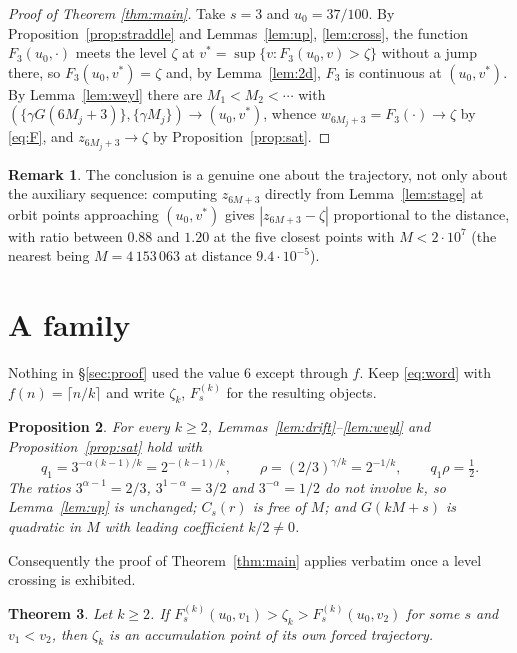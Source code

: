 \documentclass[11pt,a4paper]{article}
\theoremstyle{plain}
\newtheorem{theorem}{Theorem}
\newtheorem{proposition}[theorem]{Proposition}
\theoremstyle{definition}
\newtheorem{remark}[theorem]{Remark}
\newcommand{\al}{\alpha}
\newcommand{\ga}{\gamma}
\newcommand{\fr}[1]{\{#1\}}
\begin{document}
\begin{proof}[Proof of Theorem \ref{thm:main}]
Take $s=3$ and $u_0=37/100$. By Proposition~\ref{prop:straddle} and Lemmas~\ref{lem:up},
\ref{lem:cross}, the function $F_3(u_0,\cdot)$ meets the level $\zeta$ at
$v^*=\sup\{v:F_3(u_0,v)>\zeta\}$ without a jump there, so $F_3(u_0,v^*)=\zeta$ and, by
Lemma~\ref{lem:2d}, $F_3$ is continuous at $(u_0,v^*)$. By Lemma~\ref{lem:weyl} there are
$M_1<M_2<\cdots$ with $(\fr{\ga G(6M_j+3)},\fr{\ga M_j})\to(u_0,v^*)$, whence
$w_{6M_j+3}=F_3(\cdot)\to\zeta$ by \eqref{eq:F}, and $z_{6M_j+3}\to\zeta$ by
Proposition~\ref{prop:sat}.
\end{proof}

\begin{remark}
The conclusion is a genuine one about the trajectory, not only about the auxiliary sequence:
computing $z_{6M+3}$ directly from Lemma~\ref{lem:stage} at orbit points approaching $(u_0,v^*)$
gives $|z_{6M+3}-\zeta|$ proportional to the distance, with ratio between $0.88$ and $1.20$ at the
five closest points with $M<2\cdot10^7$ (the nearest being $M=4\,153\,063$ at distance
$9.4\cdot10^{-5}$).
\end{remark}

\section{A family}\label{sec:family}

Nothing in \S\ref{sec:proof} used the value $6$ except through $f$. Keep \eqref{eq:word} with
$f(n)=\lceil n/k\rceil$ and write $\zeta_k$, $F^{(k)}_s$ for the resulting objects.

\begin{proposition}\label{prop:family}
For every $k\ge2$, Lemmas~\ref{lem:drift}--\ref{lem:weyl} and Proposition~\ref{prop:sat} hold with
\[
   q_1=3^{-\al(k-1)/k}=2^{-(k-1)/k},\qquad \rho=(2/3)^{\ga/k}=2^{-1/k},
   \qquad q_1\rho=\tfrac12 .
\]
The ratios $3^{\al-1}=2/3$, $3^{1-\al}=3/2$ and $3^{-\al}=1/2$ do not involve $k$, so
Lemma~\ref{lem:up} is unchanged; $C_s(r)$ is free of $M$; and $G(kM+s)$ is quadratic in $M$ with
leading coefficient $k/2\ne0$.
\end{proposition}

Consequently the proof of Theorem~\ref{thm:main} applies verbatim once a level crossing is
exhibited.

\begin{theorem}\label{thm:family}
Let $k\ge2$. If $F^{(k)}_s(u_0,v_1)>\zeta_k>F^{(k)}_s(u_0,v_2)$ for some $s$ and $v_1<v_2$, then
$\zeta_k$ is an accumulation point of its own forced trajectory.
\end{theorem}
\end{document}
